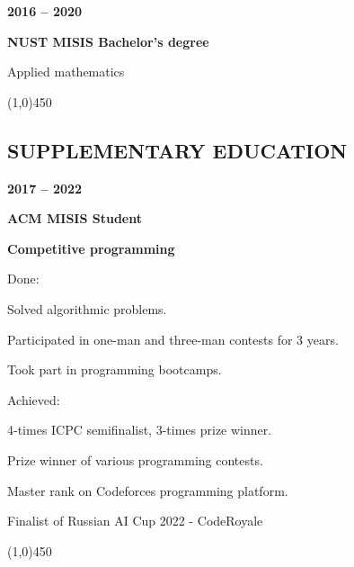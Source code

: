 \documentclass[a4paper,12pt,preview]{report}
\newcommand{\hr}{\begin{center} \line(1,0){450} \end{center}}
\begin{document}
\vspace{5mm} %

\begin{minipage}[c]{0.25\linewidth}
    \textbf{2016 – 2020}
\end{minipage}
\begin{minipage}[c]{0.65\linewidth}
    \textbf{NUST MISIS Bachelor's degree}

    Applied mathematics
\end{minipage}

\hr


\subsection*{SUPPLEMENTARY EDUCATION}

\begin{minipage}[c]{0.25\linewidth}
    \textbf{2017 – 2022} 
\end{minipage}
\begin{minipage}[c]{0.65\linewidth}
    \textbf{ACM MISIS Student}
    
    \textbf{Competitive programming}
\end{minipage}

\vspace{5mm} %

\begin{minipage}[c]{0.15\linewidth}
    Done:
\end{minipage}
\begin{minipage}[c]{0.75\linewidth}
	Solved algorithmic problems.
	
	Participated in one-man and three-man contests for 3 years.
	
	Took part in programming bootcamps.
\end{minipage}

\vspace{5mm} %

\begin{minipage}[c]{0.15\linewidth}
    Achieved:
\end{minipage}
\begin{minipage}[c]{0.75\linewidth}
	4-times ICPC semifinalist, 3-times prize winner.
	
	Prize winner of various programming contests.
	
	Master rank on Codeforces programming platform.
	
	Finalist of Russian AI Cup 2022 - CodeRoyale
\end{minipage}

\hr 
\end{document}
